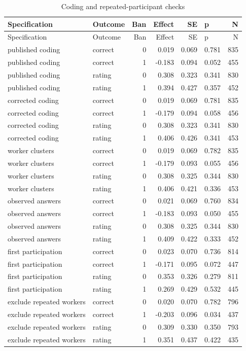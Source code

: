 
\begin{longtable}[t]{llrrrlr}
\caption{Coding and repeated-participant checks}\\
\toprule
Specification & Outcome & Ban & Effect & SE & p & N\\
\midrule
\endfirsthead
\toprule
Specification & Outcome & Ban & Effect & SE & p & N\\
\midrule
\endhead
published coding & correct & 0 & 0.019 & 0.069 & 0.781 & 835\\
published coding & correct & 1 & -0.183 & 0.094 & 0.052 & 455\\
published coding & rating & 0 & 0.308 & 0.323 & 0.341 & 830\\
published coding & rating & 1 & 0.394 & 0.427 & 0.357 & 452\\
corrected coding & correct & 0 & 0.019 & 0.069 & 0.781 & 835\\
corrected coding & correct & 1 & -0.179 & 0.094 & 0.058 & 456\\
corrected coding & rating & 0 & 0.308 & 0.323 & 0.341 & 830\\
corrected coding & rating & 1 & 0.406 & 0.426 & 0.341 & 453\\
worker clusters & correct & 0 & 0.019 & 0.069 & 0.782 & 835\\
worker clusters & correct & 1 & -0.179 & 0.093 & 0.055 & 456\\
worker clusters & rating & 0 & 0.308 & 0.325 & 0.344 & 830\\
worker clusters & rating & 1 & 0.406 & 0.421 & 0.336 & 453\\
observed answers & correct & 0 & 0.021 & 0.069 & 0.760 & 834\\
observed answers & correct & 1 & -0.183 & 0.093 & 0.050 & 455\\
observed answers & rating & 0 & 0.308 & 0.325 & 0.344 & 830\\
observed answers & rating & 1 & 0.409 & 0.422 & 0.333 & 452\\
first participation & correct & 0 & 0.023 & 0.070 & 0.736 & 814\\
first participation & correct & 1 & -0.171 & 0.095 & 0.072 & 447\\
first participation & rating & 0 & 0.353 & 0.326 & 0.279 & 811\\
first participation & rating & 1 & 0.269 & 0.429 & 0.532 & 445\\
exclude repeated workers & correct & 0 & 0.020 & 0.070 & 0.782 & 796\\
exclude repeated workers & correct & 1 & -0.203 & 0.096 & 0.034 & 437\\
exclude repeated workers & rating & 0 & 0.309 & 0.330 & 0.350 & 793\\
exclude repeated workers & rating & 1 & 0.351 & 0.437 & 0.422 & 435\\
\bottomrule
\end{longtable}
